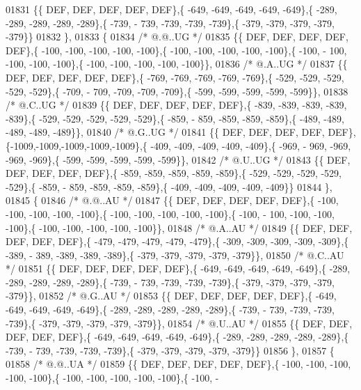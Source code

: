 \begin{DoxyCode}
01831 \{\{  DEF,  DEF,  DEF,  DEF,  DEF\},\{ -649, -649, -649, -649, -649\},\{ -289, -289, -289, -289, -289\},\{ -739, -
      739, -739, -739, -739\},\{ -379, -379, -379, -379, -379\}\}
01832 \},
01833 \{
01834 \textcolor{comment}{/*  @.@..UG */}
01835 \{\{  DEF,  DEF,  DEF,  DEF,  DEF\},\{ -100, -100, -100, -100, -100\},\{ -100, -100, -100, -100, -100\},\{ -100, -
      100, -100, -100, -100\},\{ -100, -100, -100, -100, -100\}\},
01836 \textcolor{comment}{/*  @.A..UG */}
01837 \{\{  DEF,  DEF,  DEF,  DEF,  DEF\},\{ -769, -769, -769, -769, -769\},\{ -529, -529, -529, -529, -529\},\{ -709, -
      709, -709, -709, -709\},\{ -599, -599, -599, -599, -599\}\},
01838 \textcolor{comment}{/*  @.C..UG */}
01839 \{\{  DEF,  DEF,  DEF,  DEF,  DEF\},\{ -839, -839, -839, -839, -839\},\{ -529, -529, -529, -529, -529\},\{ -859, -
      859, -859, -859, -859\},\{ -489, -489, -489, -489, -489\}\},
01840 \textcolor{comment}{/*  @.G..UG */}
01841 \{\{  DEF,  DEF,  DEF,  DEF,  DEF\},\{-1009,-1009,-1009,-1009,-1009\},\{ -409, -409, -409, -409, -409\},\{ -969, -
      969, -969, -969, -969\},\{ -599, -599, -599, -599, -599\}\},
01842 \textcolor{comment}{/*  @.U..UG */}
01843 \{\{  DEF,  DEF,  DEF,  DEF,  DEF\},\{ -859, -859, -859, -859, -859\},\{ -529, -529, -529, -529, -529\},\{ -859, -
      859, -859, -859, -859\},\{ -409, -409, -409, -409, -409\}\}
01844 \},
01845 \{
01846 \textcolor{comment}{/*  @.@..AU */}
01847 \{\{  DEF,  DEF,  DEF,  DEF,  DEF\},\{ -100, -100, -100, -100, -100\},\{ -100, -100, -100, -100, -100\},\{ -100, -
      100, -100, -100, -100\},\{ -100, -100, -100, -100, -100\}\},
01848 \textcolor{comment}{/*  @.A..AU */}
01849 \{\{  DEF,  DEF,  DEF,  DEF,  DEF\},\{ -479, -479, -479, -479, -479\},\{ -309, -309, -309, -309, -309\},\{ -389, -
      389, -389, -389, -389\},\{ -379, -379, -379, -379, -379\}\},
01850 \textcolor{comment}{/*  @.C..AU */}
01851 \{\{  DEF,  DEF,  DEF,  DEF,  DEF\},\{ -649, -649, -649, -649, -649\},\{ -289, -289, -289, -289, -289\},\{ -739, -
      739, -739, -739, -739\},\{ -379, -379, -379, -379, -379\}\},
01852 \textcolor{comment}{/*  @.G..AU */}
01853 \{\{  DEF,  DEF,  DEF,  DEF,  DEF\},\{ -649, -649, -649, -649, -649\},\{ -289, -289, -289, -289, -289\},\{ -739, -
      739, -739, -739, -739\},\{ -379, -379, -379, -379, -379\}\},
01854 \textcolor{comment}{/*  @.U..AU */}
01855 \{\{  DEF,  DEF,  DEF,  DEF,  DEF\},\{ -649, -649, -649, -649, -649\},\{ -289, -289, -289, -289, -289\},\{ -739, -
      739, -739, -739, -739\},\{ -379, -379, -379, -379, -379\}\}
01856 \},
01857 \{
01858 \textcolor{comment}{/*  @.@..UA */}
01859 \{\{  DEF,  DEF,  DEF,  DEF,  DEF\},\{ -100, -100, -100, -100, -100\},\{ -100, -100, -100, -100, -100\},\{ -100, -

\end{DoxyCode}
